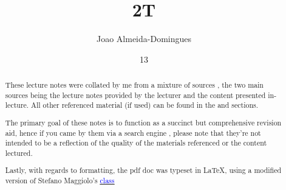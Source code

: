 \documentclass[english,course]{Notes}
\title{2T}
\author{Joao Almeida-Domingues}
\date{13}{01}{2020}
\begin{document}

\begin{abstract}
	\par{These lecture notes were collated by me from a mixture of sources , the two main sources being the lecture notes provided by the lecturer and the 
content presented in-lecture. All other referenced material (if used) can be found in the  and  sections.}
	\par{The primary goal of these notes is to function as a succinct but comprehensive revision aid, hence if you came by them via a search engine , please note 
that they're not intended to be a reflection of the quality of the materials referenced or the content lectured.}
	\par{Lastly, with regards to formatting, the pdf doc was typeset in \LaTeX , using a modified version of Stefano Maggiolo's \href{http://blog.poormansmath.net/
latex-class-for-lecture-notes/}{\underline{\textcolor{blue}{class}}}}
\end{abstract}
\newpage


%



\newpage
\nocite{*}
\printbibliography

\end{document}
